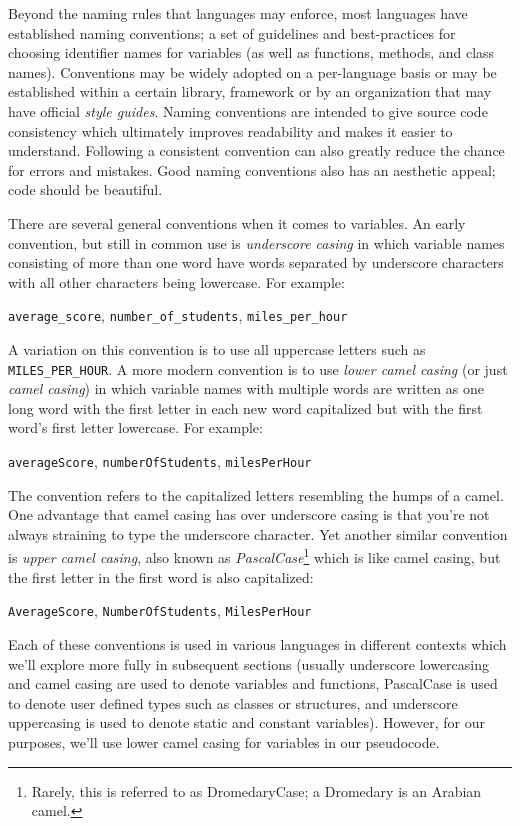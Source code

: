 Beyond the naming rules that languages may enforce, most languages have established \glspl{naming convention}; a set of guidelines and best-practices for choosing
identifier names for variables (as well as functions, methods, and class names).  
Conventions may be widely adopted on a per-language basis or may be established
within a certain library, framework or by an organization that may have
official  \emph{style guides}.  Naming conventions are
intended to give source code consistency which ultimately improves readability and 
makes it easier to understand.  Following a consistent convention can also greatly
reduce the chance for errors and mistakes.  Good naming conventions also has an
aesthetic appeal; code should be beautiful.  

There are several general conventions when it comes to variables.  An early 
convention, but still in common use is  
\emph{underscore casing} in which 
variable names consisting of more than one word have words separated by
underscore characters with all other characters being lowercase.  For example:
\begin{center}
\texttt{average_score}, \texttt{number_of_students}, \texttt{miles_per_hour}
\end{center}
A variation on this convention is to use all uppercase letters such as \texttt{MILES_PER_HOUR}.
A more modern convention is to use  \emph{lower camel casing} (or just \emph{camel casing}) in
which variable names with multiple words are written as one long word with the
first letter in each new word capitalized but with the first word's first letter lowercase.  For example:

\begin{center}
\texttt{averageScore}, \texttt{numberOfStudents}, \texttt{milesPerHour}
\end{center}
The convention refers to the capitalized letters resembling the humps of a camel.
One advantage that camel casing has over underscore casing is that you're not always
straining to type the underscore character.  Yet another similar convention 
is  \emph{upper camel casing}, also known as \emph{PascalCase}\footnote{Rarely, this is referred to as DromedaryCase; 
a Dromedary is an Arabian camel.} which is like camel casing, but the first letter
in the first word is also capitalized:
\begin{center}
\texttt{AverageScore}, \texttt{NumberOfStudents}, \texttt{MilesPerHour}
\end{center}
Each of these conventions is used in various languages in different contexts which
we'll explore more fully in subsequent sections (usually
underscore lowercasing and camel casing are used to denote variables and
functions, PascalCase is used to denote user defined types such as classes or 
structures, and underscore uppercasing is used to denote static and constant variables).  
However, for our purposes, we'll use lower camel casing for variables in our pseudocode.


